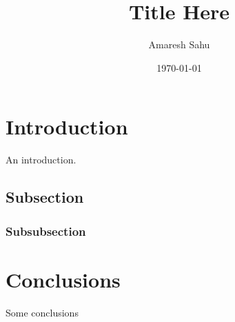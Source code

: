 \documentclass[10pt,notitlepage,twocolumn]{article}
\title{\bfseries{\Large{\sffamily Title Here}}}
\author{\large{\sffamily Amaresh Sahu}}
\date{\footnotesize \sffamily \today}
\begin{document}



%
%

\renewcommand{\abstractname}{}



%
%

\section{Introduction}

An introduction.

\subsection{Subsection}

\subsubsection{Subsubsection}



%
%

\section{Conclusions}

Some conclusions




\end{document}

